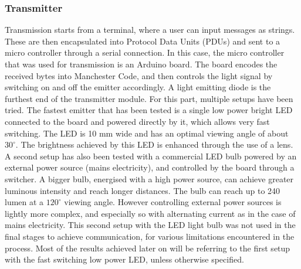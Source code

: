 \subsubsection{Transmitter}
Transmission starts from a terminal, where a user can input messages as strings. These are then encapsulated into Protocol Data Units (PDUs) and sent to a micro controller through a serial connection.
In this case, the micro controller that was used for transmission is an Arduino board.
The board encodes the received bytes into Manchester Code, and then controls the light signal by switching on and off the emitter accordingly.
A light emitting diode is the furthest end of the transmitter module.
For this part, multiple setups have been tried.
The fastest emitter that has been tested is a single low power bright LED connected to the board and powered directly by it, which allows very fast switching.
The LED is 10 mm wide and has an optimal viewing angle of about $30^{\circ}$.
The brightness achieved by this LED is enhanced through the use of a lens.
A second setup has also been tested with a commercial LED bulb powered by an external power source (mains electricity), and controlled by the board through a switcher. 
A bigger bulb, energised with a high power source, can achieve greater luminous intensity and reach longer distances.
The bulb can reach up to 240 lumen at a $120^{\circ}$ viewing angle.
However controlling external power sources is lightly more complex, and especially so with alternating current as in the case of mains electricity.
This second setup with the LED light bulb was not used in the final stages to achieve communication, for various limitations encountered in the process.
Most of the results achieved later on will be referring to the first setup with the fast switching low power LED, unless otherwise specified.

